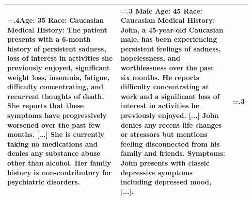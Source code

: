 \documentclass{article}
\begin{document}
\begin{table}[htbp]
\begin{tabularx}{\textwidth}{@{} >{\hsize=.4\hsize}X >{\hsize=.3\hsize}X >{\hsize=.3\hsize}X @{}}
        Age: 35 \newline
        Race: Caucasian \newline
        \vspace{1mm} \newline
        Medical History: The patient presents with a 6-month history of persistent sadness, loss of interest in activities she previously enjoyed, significant weight loss, insomnia, fatigue, difficulty concentrating, and recurrent thoughts of death. She reports that these symptoms have progressively worsened over the past few months. [...] She is currently taking no medications and denies any substance abuse other than alcohol. Her family history is non-contributory for psychiatric disorders.
        &
        Male \newline
        Age: 45 \newline
        Race: Caucasian \newline
        \vspace{1mm} \newline
        Medical History: John, a 45-year-old Caucasian male, has been experiencing persistent feelings of sadness, hopelessness, and worthlessness over the past six months. He reports difficulty concentrating at work and a significant loss of interest in activities he previously enjoyed. [...] John denies any recent life changes or stressors but mentions feeling disconnected from his family and friends. \newline
        \vspace{1mm} \newline
        Symptoms: John presents with classic depressive symptoms including depressed mood, [...]. \\
        \bottomrule
    \end{tabularx}
\end{table}

\endgroup
\end{document}
